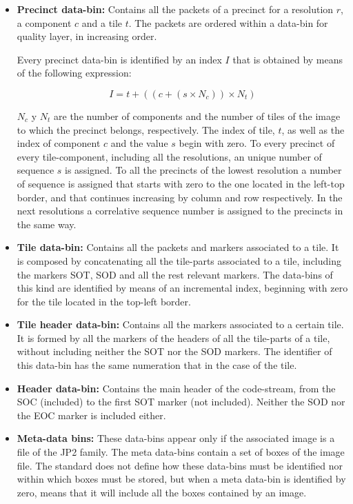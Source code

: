\begin{itemize}

\item \textbf{Precinct data-bin:} Contains all the packets of
a precinct for a resolution $r$, a component $c$ and a tile $t$.
The packets are ordered within a data-bin for quality layer,
in increasing order.

Every precinct data-bin is identified by an index $I$ that is obtained
by means of the following expression:

\begin{equation*}
I = t + \left( (c + (s \times N_c)) \times N_t \right)
\end{equation*}

$N_c$ y $N_t$ are the number of components and the number of tiles
of the image to which the precinct belongs, respectively. The
index of tile, $t$, as well as the index of component $c$ and
the value $s$ begin with zero. To every precinct of every tile-component,
including all the resolutions, an unique number of
sequence $s$ is assigned. To all the precincts of the lowest resolution
a number of sequence is assigned that starts with zero to the one
located in the left-top border, and that continues increasing
by column and row respectively. In the next resolutions
a correlative sequence number is assigned to the precincts in the
same way.

\item \textbf{Tile data-bin:} Contains all the packets and markers associated
to a tile. It is composed by concatenating all the tile-parts
associated to a tile, including the markers SOT, SOD and all the
rest relevant markers. The data-bins of this kind are identified by means
of an incremental index, beginning with zero for the tile
located in the top-left border.

\item \textbf{Tile header data-bin:} Contains all the markers associated to 
a certain tile. It is formed by all the markers of the headers of all the
tile-parts of a tile, without including neither the SOT nor the SOD markers.
The identifier of this data-bin has the same numeration that in the case
of the tile.

\item \textbf{Header data-bin:} Contains the main header of the code-stream,
from the SOC (included) to the first SOT marker (not included). Neither the
SOD nor the EOC marker is included either.

\item \textbf{Meta-data bins:} These data-bins appear only if
the associated image is a file of the JP2 family. The meta data-bins contain 
a set of boxes of
the image file. The standard does not define
how these data-bins must be identified nor within which boxes 
must be stored, but when a meta data-bin is identified by zero,
means that it will include all the boxes contained by an image. 

\end{itemize}


